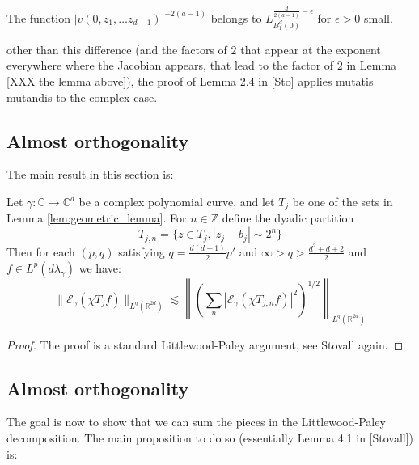 	\begin{lemma}
		The function $|v(0, z_1, \dots z_{d-1})|^{-2(a-1)}$ belongs to $L^{\frac{d}{2(a-1)}-\epsilon}_{B_1^d(0)}$ for $\epsilon > 0$ small.
	\end{lemma}

	other than this difference (and the factors of $2$ that appear at the exponent everywhere where the Jacobian appears, that lead to the factor of $2$ in Lemma [XXX the lemma above]), the proof of Lemma 2.4 in [Sto] applies mutatis mutandis to the complex case.





	\subsection{Almost orthogonality} %
	\label{sub:almost_orthogonality}

	The main result in this section is:

	\begin{lemma}
		Let $\gamma:\mathbb C\to \mathbb C^d$ be a complex polynomial curve, and let $T_j$ be one of the sets in Lemma \ref{lem:geometric_lemma}. For $n\in \mathbb  Z$ define the dyadic partition
		\begin{equation}
			T_{j,n} = \{z \in T_j, |z_j - b_j| \sim 2^n\}
		\end{equation}
		Then for each $(p,q)$ satisfying $q= \frac{d(d+1)}{2}p'$ and $\infty > q > \frac{d^2+d+2}{2}$ and $f \in L^p(d\lambda_\gamma)$ we have:
		\begin{equation}
			\|\mathcal E_\gamma (\chi {T_j} f)\|_{L^q(\mathbb R^{2d})} \lesssim 
			\left\|
			\left(
				\sum_n |\mathcal E_\gamma (\chi {T_{j,n}} f)|^2
			\right)^{1/2}
			\right\|_{L^q(\mathbb R^{2d})}
		\end{equation}
	\end{lemma}

	\begin{proof}
		The proof is a standard Littlewood-Paley argument, see Stovall again.
	\end{proof}
	

	\subsection{Almost orthogonality} %
	\label{sub:almost_orthogonality}

	The goal is now to show that we can sum the pieces in the Littlewood-Paley decomposition. The main proposition to do so (essentially Lemma 4.1 in [Stovall]) is:

